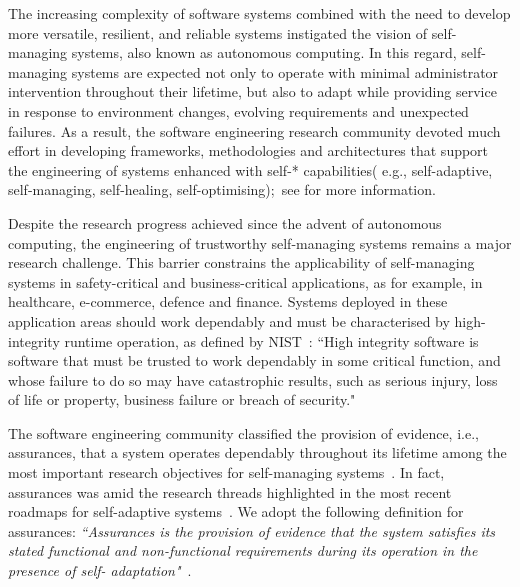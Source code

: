 
The increasing complexity of software systems combined with the need to develop more versatile, resilient, and reliable systems instigated the vision of self-managing systems, also known as autonomous computing\cite{Kephart2003:Comp, Ganek2003:IBM}. In this regard, self-managing systems are expected not only to operate with minimal administrator intervention throughout their lifetime, but also to adapt while providing service in response to environment changes, evolving requirements and unexpected failures. As a result, the software engineering research community devoted much effort in developing frameworks, methodologies and architectures that support the engineering of systems enhanced with self-* capabilities( e.g., self-adaptive, self-managing, self-healing, self-optimising);~see \cite{Salehie2009:TAAS, Huebscher2008:ACM} for more information. 

Despite the research progress achieved since the advent of autonomous computing, the engineering of trustworthy self-managing systems remains a major research challenge. This barrier constrains the applicability of self-managing systems in safety-critical and business-critical applications, as for example, in healthcare, e-commerce, defence and finance. Systems deployed in these application areas should work dependably and must be characterised by high-integrity runtime operation, as defined by NIST~\cite{NIST}: ``High integrity software is software that must be trusted to work dependably in some critical function, and whose failure to do so may have catastrophic results, such as serious injury, loss of life or property, business failure or breach of security."

The software engineering community classified the provision of evidence, i.e., assurances, that a system operates dependably throughout its lifetime among the most important research objectives for self-managing systems~\cite{Cheng2009:Dagstuhl}. In fact, assurances was amid the research threads highlighted in the most recent roadmaps for self-adaptive systems~\cite{Lemos2013:Dagstuhl, Lemos2014:Dagstuhl}. We adopt the following definition for assurances: \textit{``Assurances  is the provision of evidence that the system satisfies its stated functional and non-functional requirements during its operation in the presence of self- adaptation"}~\cite{Lemos2014:Dagstuhl}.

